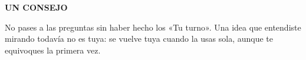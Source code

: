 \vspace{8pt}
\begin{tcolorbox}[enhanced,colback=zsoft,coltext=zink,boxrule=0pt,arc=3pt,left=5mm,right=5mm,top=3mm,bottom=3mm]
{\sffamily\scriptsize\bfseries\color{zolive}UN CONSEJO}\par\vspace{3pt}
\small No pases a las preguntas sin haber hecho los «Tu turno». Una idea que entendiste mirando todavía no es tuya: se vuelve
tuya cuando la usas sola, aunque te equivoques la primera vez.
\end{tcolorbox}
\clearpage
